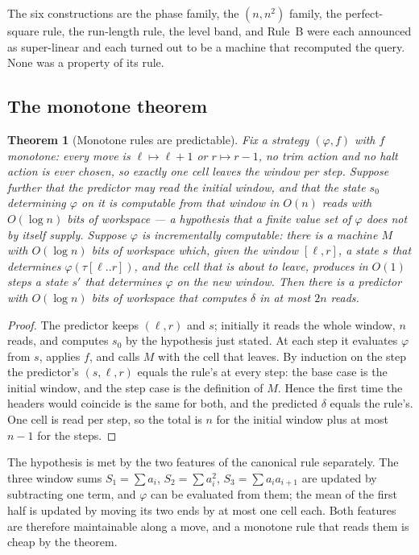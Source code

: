 \documentclass[11pt]{article}
\newtheorem{theorem}{Theorem}
\theoremstyle{remark}
\begin{document}
The six constructions are the phase family, the $(n,n^{2})$ family, the perfect-square rule, the run-length rule,
the level band, and Rule~B were each announced as super-linear and each turned out to be a machine
that recomputed the query. None was a property of its rule.

\subsection{The monotone theorem}

\begin{theorem}[Monotone rules are predictable]\label{thm:monotone}
Fix a strategy $(\varphi,f)$ with $f$ monotone: every move is $\ell\mapsto\ell+1$ or $r\mapsto r-1$,
no trim action and no halt action is ever chosen, so exactly one cell leaves the window per step.
Suppose further that the predictor may read the initial window, and that the state $s_0$ determining
$\varphi$ on it is computable from that window in $O(n)$ reads with $O(\log n)$ bits of workspace ---
a hypothesis that a finite value set of $\varphi$ does not by itself supply. Suppose $\varphi$ is
\emph{incrementally computable}: there is a machine $M$ with $O(\log n)$ bits of workspace which,
given the window $[\ell,r]$, a state $s$ that determines $\varphi(\tau[\ell..r])$, and the cell that
is about to leave, produces in $O(1)$ steps a state $s'$ that determines $\varphi$ on the new
window. Then there is a predictor with $O(\log n)$ bits of workspace that computes $\delta$ in at
most $2n$ reads.
\end{theorem}

\begin{proof}
The predictor keeps $(\ell,r)$ and $s$; initially it reads the whole window, $n$ reads, and computes
$s_0$ by the hypothesis just stated. At each step it evaluates $\varphi$ from $s$, applies $f$, and
calls $M$ with the cell that leaves. By induction on the step the predictor's $(s,\ell,r)$ equals the
rule's at every step: the base case is the initial window, and the step case is the definition of
$M$. Hence the first time the headers would coincide is the same for both, and the predicted
$\delta$ equals the rule's. One cell is read per step, so the total is $n$ for the initial window
plus at most $n-1$ for the steps.
\end{proof}

The hypothesis is met by the two features of the canonical rule separately. The three window sums
$S_1=\sum a_i$, $S_2=\sum a_i^{2}$, $S_3=\sum a_ia_{i+1}$ are updated by subtracting one term, and
$\varphi$ can be evaluated from them; the mean of the first half is updated by moving its two ends by
at most one cell each. Both features are therefore maintainable along a move, and a monotone rule
that reads them is cheap by the theorem.
\end{document}
